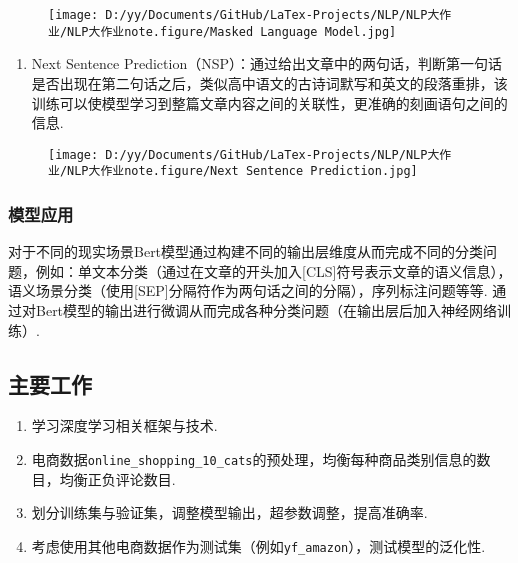 \documentclass[
]{article}
\begin{document}
\begin{figure}
\centering
\texttt{[image: D:/yy/Documents/GitHub/LaTex-Projects/NLP/NLP大作业/NLP大作业note.figure/Masked Language Model.jpg]}
\caption{}
\end{figure}

\begin{enumerate}
\def\labelenumi{\arabic{enumi}.}
\item
  Next Sentence
  Prediction（NSP）：通过给出文章中的两句话，判断第一句话是否出现在第二句话之后，类似高中语文的古诗词默写和英文的段落重排，该训练可以使模型学习到整篇文章内容之间的关联性，更准确的刻画语句之间的信息.
\end{enumerate}

\begin{figure}
\centering
\texttt{[image: D:/yy/Documents/GitHub/LaTex-Projects/NLP/NLP大作业/NLP大作业note.figure/Next Sentence Prediction.jpg]}
\caption{}
\end{figure}

\hypertarget{ux6a21ux578bux5e94ux7528}{%
\subsubsection{模型应用}\label{ux6a21ux578bux5e94ux7528}}

对于不同的现实场景Bert模型通过构建不同的输出层维度从而完成不同的分类问题，例如：单文本分类（通过在文章的开头加入{[}CLS{]}符号表示文章的语义信息），语义场景分类（使用{[}SEP{]}分隔符作为两句话之间的分隔），序列标注问题等等.
通过对Bert模型的输出进行微调从而完成各种分类问题（在输出层后加入神经网络训练）.

\hypertarget{ux4e3bux8981ux5de5ux4f5c}{%
\subsection{主要工作}\label{ux4e3bux8981ux5de5ux4f5c}}

\begin{enumerate}
\def\labelenumi{\arabic{enumi}.}
\item
  学习深度学习相关框架与技术.
\item
  电商数据\texttt{online\_shopping\_10\_cats}的预处理，均衡每种商品类别信息的数目，均衡正负评论数目.
\item
  划分训练集与验证集，调整模型输出，超参数调整，提高准确率.
\item
  考虑使用其他电商数据作为测试集（例如\texttt{yf\_amazon}），测试模型的泛化性.
\end{enumerate}
\end{document}
